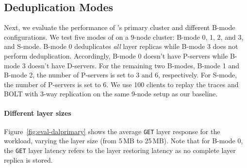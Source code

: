 


\subsection{Deduplication Modes}
\label{sec:eval-primary}
Next, we evaluate the performance of \sysname's primary cluster
and different B-mode configurations.
%
We test five modes of \sysname on a 9-node cluster: B-mode 0, 1, 2, and 3,
and S-mode.
%
B-mode 0 deduplicates \emph{all} layer replicas while B-mode 3 does not perform deduplication.
%
Accordingly, B-mode 0 doesn't have P-servers while B-mode 3 doesn't have D-servers.
%
For the remaining two B-modes, B-mode 1 and B-mode 2, the number of P-servers
is set to 3 and 6, respectively. For S-mode, the number of P-servers is set to 6.
%
We use 100 clients to replay the traces and BOLT with 3-way replication on the same 9-node setup as our baseline. 

%
\paragraph{Different layer sizes} Figure~\ref{fig:eval-dalprimary} shows the average \texttt{GET} layer response
for the \dal workload, varying the layer size (from 5\,MB to 25\,MB).
%
Note that for B-mode 0, the \texttt{GET} layer latency refers to the
layer restoring latency as no complete layer replica is stored.


